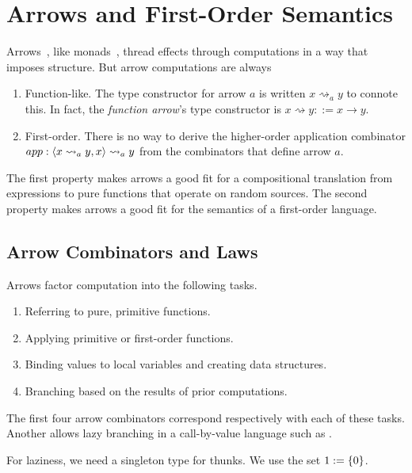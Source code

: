 \documentclass{llncs}
\newcommand{\arrow}{\rightsquigarrow}
\newcommand{\apair}{\ensuremath{\mathit{\&\mspace{-7.5mu}\&\mspace{-7.5mu}\&}}}
\begin{document}
\section{Arrows and First-Order Semantics}
\label{sec:arrows}

Arrows~\cite{cit:hughes-2000scp-arrows}, like monads~\cite{cit:wadler-2001-monads}, thread effects through computations in a way that imposes structure.
But arrow computations are always
\begin{enumerate}
	\item Function-like. The type constructor for arrow $a$ is written $x \arrow_a y$ to connote this. In fact, the \emph{function arrow}'s type constructor is $x \arrow y ::= x \to y$.
	\item First-order. There is no way to derive the higher-order application combinator $app : \pair{x \arrow_a y, x} \arrow_a y$ from the combinators that define arrow $a$.
\end{enumerate}
The first property makes arrows a good fit for a compositional translation from expressions to pure functions that operate on random sources.
The second property makes arrows a good fit for the semantics of a first-order language.

\subsection{Arrow Combinators and Laws}
\label{sec:arrow-definitions}

Arrows factor computation into the following tasks.
\begin{enumerate}
	\item Referring to pure, primitive functions.
	\item Applying primitive or first-order functions.
	\item Binding values to local variables and creating data structures.
	\item Branching based on the results of prior computations.
\end{enumerate}
The first four arrow combinators correspond respectively with each of these tasks.
Another allows lazy branching in a call-by-value language such as \lzfclang.

For laziness, we need a singleton type for thunks.
We use the set $1 := \{{0}\}$.

\newcommand{\arrowfootnote}{These are actually arrows \emph{with choice}, which are typically defined using $first_a$ and $left_a$ instead of $(\apair_a)$ and $ifte_a$.
We find $ifte_a$ more natural for semantics than $left_a$, and $(\apair_a)$ better matches the pairing preimage identity in~\eqref{eqn:preimage-identities}.}
\end{document}
